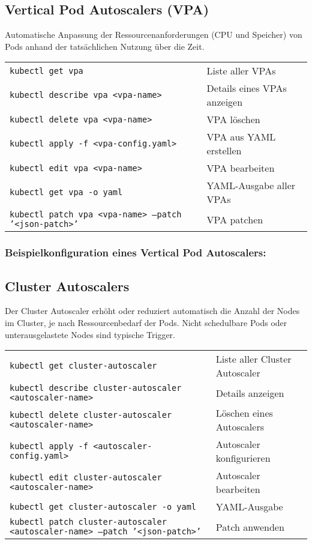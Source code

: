 \subsection{Vertical Pod Autoscalers (VPA)}
Automatische Anpassung der Ressourcenanforderungen (CPU und Speicher) von Pods anhand der tatsächlichen Nutzung über die Zeit. \\

\noindent
\begin{tabular}{|p{}|p{}|}
\hline
\texttt{kubectl get vpa} & Liste aller VPAs \\
\texttt{kubectl describe vpa <vpa-name>} & Details eines VPAs anzeigen \\
\texttt{kubectl delete vpa <vpa-name>} & VPA löschen \\
\texttt{kubectl apply -f <vpa-config.yaml>} & VPA aus YAML erstellen \\
\texttt{kubectl edit vpa <vpa-name>} & VPA bearbeiten \\
\texttt{kubectl get vpa -o yaml} & YAML-Ausgabe aller VPAs \\
\texttt{kubectl patch vpa <vpa-name> --patch '<json-patch>'} & VPA patchen \\
\hline
\end{tabular}
\subsubsection{Beispielkonfiguration eines Vertical Pod Autoscalers:}



\subsection{Cluster Autoscalers}
Der Cluster Autoscaler erhöht oder reduziert automatisch die Anzahl der Nodes im Cluster, je nach Ressourcenbedarf der Pods. Nicht schedulbare Pods oder unterausgelastete Nodes sind typische Trigger. \\

\noindent
\begin{tabular}{|p{}|p{}|}
\hline
\texttt{kubectl get cluster-autoscaler} & Liste aller Cluster Autoscaler \\
\texttt{kubectl describe cluster-autoscaler <autoscaler-name>} & Details anzeigen \\
\texttt{kubectl delete cluster-autoscaler <autoscaler-name>} & Löschen eines Autoscalers \\
\texttt{kubectl apply -f <autoscaler-config.yaml>} & Autoscaler konfigurieren \\
\texttt{kubectl edit cluster-autoscaler <autoscaler-name>} & Autoscaler bearbeiten \\
\texttt{kubectl get cluster-autoscaler -o yaml} & YAML-Ausgabe \\
\texttt{kubectl patch cluster-autoscaler <autoscaler-name> --patch '<json-patch>'} & Patch anwenden \\
\hline
\end{tabular}
